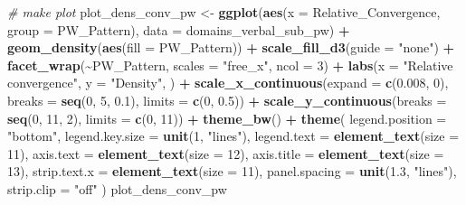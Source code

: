 \documentclass[
]{article}
\newenvironment{Shaded}{\begin{snugshade}}{\end{snugshade}}
\newcommand{\AttributeTok}[1]{\textcolor[rgb]{0.13,0.29,0.53}{#1}}
\newcommand{\CommentTok}[1]{\textcolor[rgb]{0.56,0.35,0.01}{\textit{#1}}}
\newcommand{\DecValTok}[1]{\textcolor[rgb]{0.00,0.00,0.81}{#1}}
\newcommand{\FloatTok}[1]{\textcolor[rgb]{0.00,0.00,0.81}{#1}}
\newcommand{\FunctionTok}[1]{\textcolor[rgb]{0.13,0.29,0.53}{\textbf{#1}}}
\newcommand{\NormalTok}[1]{#1}
\newcommand{\OtherTok}[1]{\textcolor[rgb]{0.56,0.35,0.01}{#1}}
\newcommand{\SpecialCharTok}[1]{\textcolor[rgb]{0.81,0.36,0.00}{\textbf{#1}}}
\newcommand{\StringTok}[1]{\textcolor[rgb]{0.31,0.60,0.02}{#1}}
\begin{document}
\begin{Shaded}
\begin{Highlighting}[]
\CommentTok{\# make plot}
\NormalTok{plot\_dens\_conv\_pw }\OtherTok{\textless{}{-}} \FunctionTok{ggplot}\NormalTok{(}\FunctionTok{aes}\NormalTok{(}\AttributeTok{x =}\NormalTok{ Relative\_Convergence, }\AttributeTok{group =}\NormalTok{ PW\_Pattern), }\AttributeTok{data =}\NormalTok{ domains\_verbal\_sub\_pw) }\SpecialCharTok{+}
  \FunctionTok{geom\_density}\NormalTok{(}\FunctionTok{aes}\NormalTok{(}\AttributeTok{fill =}\NormalTok{ PW\_Pattern)) }\SpecialCharTok{+}
  \FunctionTok{scale\_fill\_d3}\NormalTok{(}\AttributeTok{guide =} \StringTok{"none"}\NormalTok{) }\SpecialCharTok{+}
  \FunctionTok{facet\_wrap}\NormalTok{(}\SpecialCharTok{\textasciitilde{}}\NormalTok{PW\_Pattern, }\AttributeTok{scales =} \StringTok{"free\_x"}\NormalTok{, }\AttributeTok{ncol =} \DecValTok{3}\NormalTok{) }\SpecialCharTok{+}
  \FunctionTok{labs}\NormalTok{(}\AttributeTok{x =} \StringTok{"Relative convergence"}\NormalTok{, }\AttributeTok{y =} \StringTok{"Density"}\NormalTok{, ) }\SpecialCharTok{+}
  \FunctionTok{scale\_x\_continuous}\NormalTok{(}\AttributeTok{expand =} \FunctionTok{c}\NormalTok{(}\FloatTok{0.008}\NormalTok{, }\DecValTok{0}\NormalTok{), }\AttributeTok{breaks =} \FunctionTok{seq}\NormalTok{(}\DecValTok{0}\NormalTok{, }\DecValTok{5}\NormalTok{, }\FloatTok{0.1}\NormalTok{), }\AttributeTok{limits =} \FunctionTok{c}\NormalTok{(}\DecValTok{0}\NormalTok{, }\FloatTok{0.5}\NormalTok{)) }\SpecialCharTok{+}
  \FunctionTok{scale\_y\_continuous}\NormalTok{(}\AttributeTok{breaks =} \FunctionTok{seq}\NormalTok{(}\DecValTok{0}\NormalTok{, }\DecValTok{11}\NormalTok{, }\DecValTok{2}\NormalTok{), }\AttributeTok{limits =} \FunctionTok{c}\NormalTok{(}\DecValTok{0}\NormalTok{, }\DecValTok{11}\NormalTok{)) }\SpecialCharTok{+}
  \FunctionTok{theme\_bw}\NormalTok{() }\SpecialCharTok{+}
  \FunctionTok{theme}\NormalTok{(}
    \AttributeTok{legend.position =} \StringTok{"bottom"}\NormalTok{,}
    \AttributeTok{legend.key.size =} \FunctionTok{unit}\NormalTok{(}\DecValTok{1}\NormalTok{, }\StringTok{"lines"}\NormalTok{),}
    \AttributeTok{legend.text =} \FunctionTok{element\_text}\NormalTok{(}\AttributeTok{size =} \DecValTok{11}\NormalTok{),}
    \AttributeTok{axis.text =} \FunctionTok{element\_text}\NormalTok{(}\AttributeTok{size =} \DecValTok{12}\NormalTok{),}
    \AttributeTok{axis.title =} \FunctionTok{element\_text}\NormalTok{(}\AttributeTok{size =} \DecValTok{13}\NormalTok{),}
    \AttributeTok{strip.text.x =} \FunctionTok{element\_text}\NormalTok{(}\AttributeTok{size =} \DecValTok{11}\NormalTok{),}
    \AttributeTok{panel.spacing =} \FunctionTok{unit}\NormalTok{(}\FloatTok{1.3}\NormalTok{, }\StringTok{"lines"}\NormalTok{),}
    \AttributeTok{strip.clip =} \StringTok{"off"}
\NormalTok{  )}
\NormalTok{plot\_dens\_conv\_pw}
\end{Highlighting}
\end{Shaded}
\end{document}
